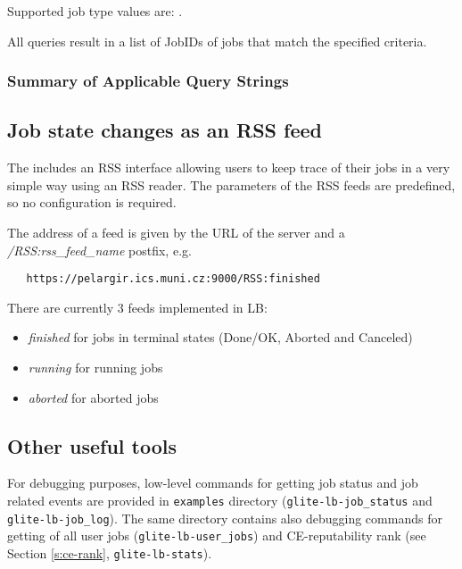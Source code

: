 {\raggedright{}Supported job type values are: \jobtypenames.}

All queries result in a list of JobIDs of jobs that match the specified criteria.



\subsubsection{Summary of Applicable Query Strings}
\label{HTML:querystrings}

\subsection{Job state changes as an RSS feed}
The \LB includes an RSS interface allowing users to keep trace of their jobs in a very simple way using an RSS reader. The parameters of the RSS feeds are predefined, so no configuration is required.

The address of a feed is given by the URL of the \LB server and a \textit{/RSS:rss\_feed\_name} postfix, e.g.
\begin{verbatim}
   https://pelargir.ics.muni.cz:9000/RSS:finished
\end{verbatim}  

There are currently 3 feeds implemented in LB:
\begin{itemize}
 \item \textit{finished} for jobs in terminal states (Done/OK, Aborted and Canceled)
 \item \textit{running} for running jobs
 \item \textit{aborted} for aborted jobs
\end{itemize}

\subsection{Other useful tools}

For debugging purposes, low-level commands for getting \LB job status and job related events are provided in 
\verb'examples' directory (\verb'glite-lb-job_status' and \verb'glite-lb-job_log'). The same directory
contains also debugging commands for getting of all user jobs (\verb'glite-lb-user_jobs') and
CE-reputability rank (see Section \ref{s:ce-rank}, \verb'glite-lb-stats').

